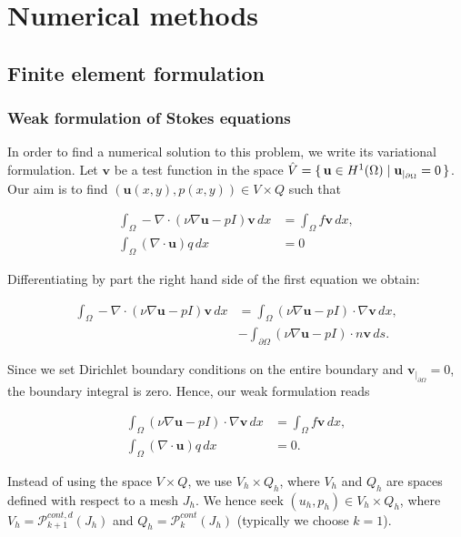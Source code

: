 \documentclass[11pt,a4paper,titlepage]{report}
\begin{document}
\chapter{Numerical methods}

\section{Finite element formulation}

\subsection{Weak formulation of Stokes equations}


In order to find a numerical solution to this problem, we write its variational formulation. Let $\mathbf{v}$ be a test function in the space $\hat{V} = \set{\mathbf{u} \in H^1(\Omega) | \mathbf{u}_{|_{\partial \Omega}} = 0} $. Our aim is to find $(\mathbf{u}(x,y),p(x,y)) \in V \times Q$ such that

\begin{align}
\int_\Omega -\nabla \cdot (\nu \nabla \mathbf{u} - pI)\mathbf{v} \,dx &= \int_\Omega f \mathbf{v} \,dx, \\
\int_\Omega (\nabla \cdot \mathbf{u})q \,dx &= 0
\end{align}

Differentiating by part the right hand side of the first equation we obtain:

\begin{align}
\int_\Omega -\nabla \cdot (\nu \nabla \mathbf{u} - pI)\mathbf{v} \,dx &= \int_\Omega (\nu \nabla \mathbf{u} - pI) \cdot \nabla \mathbf{v} \,dx, \\
&- \int_{\partial \Omega} (\nu \nabla \mathbf{u} - pI) \cdot n \mathbf{v} \,ds.
\end{align}

Since we set Dirichlet boundary conditions on the entire boundary and $\mathbf{v}_{|_{\partial \Omega}} = 0$, the boundary integral is zero. Hence, our weak formulation reads

\begin{align}
\int_\Omega (\nu \nabla \mathbf{u} - pI) \cdot \nabla \mathbf{v} \,dx &= \int_\Omega f\mathbf{v} \,dx, \\
\int_\Omega (\nabla \cdot \mathbf{u}) q \,dx &= 0.
\end{align}

Instead of using the space $V \times Q$, we use $V_h \times Q_h$, where $V_h$ and $Q_h$ are spaces defined with respect to a mesh $J_h$. We hence seek $(u_h, p_h) \in V_h \times Q_h$, where $V_h = \mathcal{P}^{cont,d}_{k+1} (J_h)$ and $Q_h = \mathcal{P}^{cont}_{k} (J_h)$ (typically we choose $k=1$). \\
\end{document}
